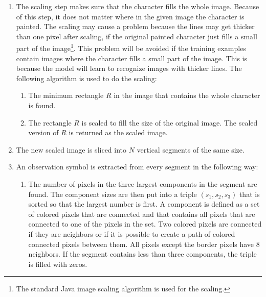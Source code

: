 \begin{enumerate}
  \item The scaling step makes sure that the character fills the whole image. 
  Because of this step, it does not matter where in the given image the character is painted. 
  The scaling may cause a problem because the lines may get thicker than one pixel after scaling, if the original painted character just fills a small part of the image\footnote{The standard Java image scaling algorithm is used for the scaling.}. 
  This problem will be avoided if the training examples contain images where the character fills a small part of the image.
  This is because the model will learn to recognize images with thicker lines.
  The following algorithm is used to do the scaling:
  \begin{enumerate}
    \item The minimum rectangle $R$ in the image that contains the whole character is found.
    \item The rectangle $R$ is scaled to fill the size of the original image. 
    The scaled version of $R$ is returned as the scaled image.
  \end{enumerate}
  \item The new scaled image is sliced into $N$ vertical segments of the same size.
  \item An observation symbol is extracted from every segment in the following way:
  \begin{enumerate}
    \item The number of pixels in the three largest components in the segment are found. 
    The component sizes are then put into a triple $(s_{1},s_{2},s_{3})$ that is sorted so that the largest number is first. 
    A component is defined as a set of colored pixels that are connected and that contains all pixels that are connected to one of the pixels in the set. 
    Two colored pixels are connected if they are neighbors or if it is possible to create a path of colored connected pixels between them. 
    All pixels except the border pixels have 8 neighbors. 
    If the segment contains less than three components, the triple is filled with zeros. 
    

\end{enumerate}
\end{enumerate}
